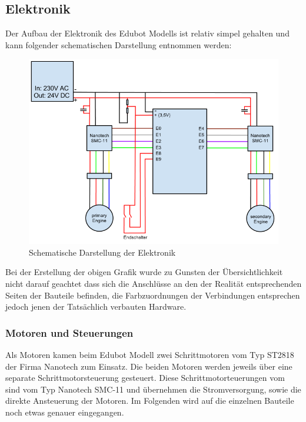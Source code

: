 \newpage
\subsection{Elektronik}
Der Aufbau der Elektronik des Edubot Modells ist relativ simpel gehalten und kann folgender schematischen Darstellung entnommen werden:

\begin{figure}[H]
  \centering
  \begin{minipage}[t]{14 cm}
  	\centering
  	\includegraphics[width=14cm]{images/edubot_electronic} 
    \caption{Schematische Darstellung der Elektronik}
  \end{minipage}
\end{figure}

Bei der Erstellung der obigen Grafik wurde zu Gunsten der Übersichtlichkeit nicht darauf geachtet dass sich die Anschlüsse an den der Realität entsprechenden Seiten der Bauteile befinden, die Farbzuordnungen der Verbindungen entsprechen jedoch jenen der Tatsächlich verbauten Hardware.

\subsubsection{Motoren und Steuerungen}
Als Motoren kamen beim Edubot Modell zwei Schrittmotoren vom Typ ST2818 der Firma Nanotech zum Einsatz. Die beiden Motoren werden jeweils über eine separate Schrittmotorsteuerung gesteuert. Diese Schrittmotorteuerungen vom sind vom Typ Nanotech SMC-11 und übernehmen die Stromversorgung, sowie die direkte Ansteuerung der Motoren. Im Folgenden wird auf die einzelnen Bauteile noch etwas genauer eingegangen.

